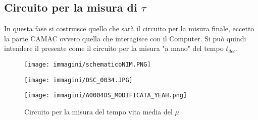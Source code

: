\documentclass[12pt,a4paper,openright,twoside]{article}
\numberwithin{equation}{section} %
\begin{document}
\subsection{Circuito per la misura di $\tau$}  \label{circpertau}


In questa fase si costruisce quello che sarà il circuito per la misura finale, eccetto la parte CAMAC ovvero quella che interagisce con il Computer. Si può quindi intendere il presente come il circuito per la misura "a mano" del tempo $t_{dec}$. 

\begin{figure}[htbp]
\begin{center}
\hspace{-0.0cm}\begin{minipage}[c]{1\linewidth}
\texttt{[image: immagini/schematicoNIM.PNG]} 
\label{fin}
\vspace{1cm}
\end{minipage}
\hspace{+0cm}\begin{minipage}[l]{.4\linewidth}
\texttt{[image: immagini/DSC\_0034.JPG]}
\label{start}
\end{minipage}%
\hspace{15mm}%
\begin{minipage}[c]{0.4\linewidth}
\texttt{[image: immagini/A0004DS\_MODIFICATA\_YEAH.png]}
\end{minipage}
\caption{Circuito per la misura del tempo vita media del $\mu$}
\end{center}
\end{figure}
\end{document}
